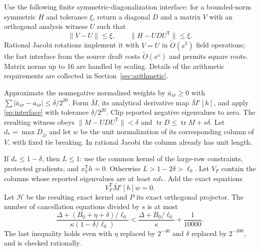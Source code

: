 \documentclass[11pt]{amsart}
\theoremstyle{remark}\newtheorem{remark}[theorem]{Remark}
\newcommand{\tr}{\operatorname{tr}}
\newcommand{\T}{\mathsf T}
\begin{document}
Use the following finite symmetric-diagonalization interface: for a
bounded-norm symmetric $H$ and tolerance $\xi$, return a diagonal $D$ and
a matrix $V$ with an orthogonal analysis witness $U$ such that
\begin{equation}\label{eq:interface}
 \|V-U\|\le\xi,\qquad \|H-UDU^\T\|\le\xi.
\end{equation}
Rational Jacobi rotations implement it with $V=U$ in
$\widetilde O(s^3)$ field operations; the fast interface from the source
draft costs $\widetilde O(s^\omega)$ and permits square roots. Matrix norms
up to 16 are handled by scaling. Details of the arithmetic requirements
are collected in Section~\ref{sec:arithmetic}.

Approximate the nonnegative normalized weights by
$\bar a_{i\sigma}\ge0$ with
$\sum|\bar a_{i\sigma}-a_{i\sigma}|\le\delta/2^{20}$.
Form $\bar M$, its analytical derivative map $\bar M'[h]$, and apply
\eqref{eq:interface} with tolerance $\delta/2^{20}$. Clip reported negative
eigenvalues to zero. The resulting witness obeys
$\|M-UDU^\T\|<\delta$ and $\tr D\le\tr M+s\delta$.
Let $d_* =\max D_{jj}$ and let $w$ be the unit normalization of its
corresponding column of $V$, with fixed tie breaking. In rational Jacobi
the column already has unit length.

If $d_*\le1-\delta$, then $L\le1$: use the common kernel of the large-row
constraints, protected gradients, and $x_V^\T h=0$.
Otherwise $L>1-2\delta>\ell_0$. Let $V_F$ contain the columns whose
reported eigenvalues are at least $\kappa d_*$. Add the exact equations
\begin{equation}\label{eq:cancellation}
 V_F^\T\bar M'[h]w=0.
\end{equation}
Let $\mathcal H$ be the resulting exact kernel and $P$ its exact orthogonal
projector. The number of cancellation equations divided by $s$ is at most
\[
 \frac{\Delta+(B_0+\eta+\delta)/\ell_0}
      {\kappa(1-\delta/\ell_0)}
 <\frac{\Delta+B_0/\ell_0}{\kappa}+\frac1{10000}.
\]
The last inequality holds even with $\eta$ replaced by $2^{-40}$ and
$\delta$ replaced by $2^{-300}$, and is checked rationally.
\end{document}
